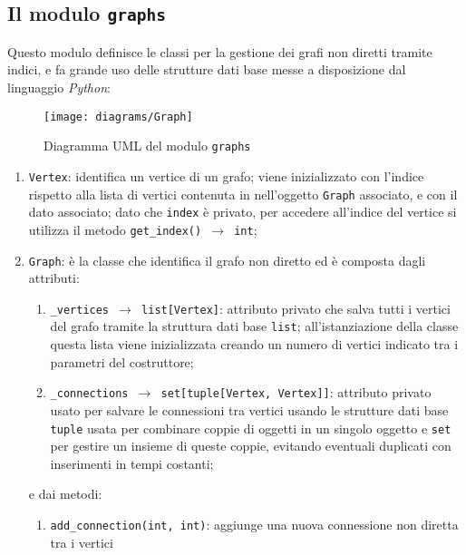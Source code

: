 \subsection{Il modulo \texttt{graphs}}
Questo modulo definisce le classi per la gestione dei grafi non diretti tramite indici, e fa grande uso delle strutture dati
base messe a disposizione dal linguaggio \textit{Python}:

\begin{figure}[!b]
      \centering
      \texttt{[image: diagrams/Graph]}
      \caption{Diagramma UML del modulo \texttt{graphs}}
\end{figure}

\begin{enumerate}
      \item \texttt{Vertex}: identifica un vertice di un grafo; viene inizializzato con l'indice rispetto
            alla lista di vertici contenuta in nell'oggetto \texttt{Graph} associato, e con il dato associato;
            dato che \texttt{index} è privato, per accedere all'indice del vertice si utilizza il metodo
            \texttt{get\_index() $\rightarrow$ int};
      \item \texttt{Graph}: è la classe che identifica il grafo non diretto ed è composta dagli attributi:
            \begin{enumerate}
                  \item \texttt{\_vertices $\rightarrow$ list[Vertex]}: attributo privato che salva tutti i
                        vertici del grafo tramite la struttura dati base \texttt{list}; all'istanziazione
                        della classe questa lista viene inizializzata creando un numero di vertici indicato
                        tra i parametri del costruttore;
                  \item \texttt{\_connections $\rightarrow$ set[tuple[Vertex, Vertex]]}: attributo privato usato
                        per salvare le connessioni tra vertici usando le strutture dati base \texttt{tuple} usata
                        per combinare coppie di oggetti in un singolo oggetto e \texttt{set} per gestire un insieme
                        di queste coppie, evitando eventuali duplicati con inserimenti in tempi costanti;
            \end{enumerate}
            e dai metodi:
            \begin{enumerate}[resume]
                  \item \texttt{add\_connection(int, int)}: aggiunge una nuova connessione non diretta tra i vertici

\end{enumerate}
\end{enumerate}
